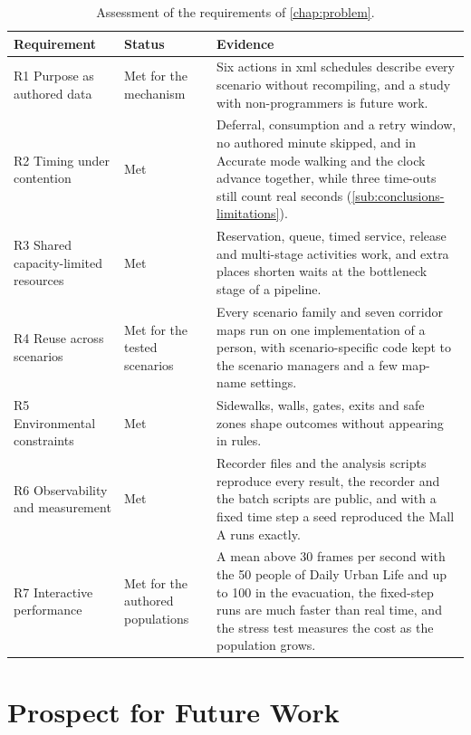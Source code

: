 \begin{table}[H]
\centering
\small
\renewcommand{\arraystretch}{1.1}
\begin{tabular}{|L{0.2\textwidth}|L{0.13\textwidth}|L{0.59\textwidth}|}
\hline
{}\textbf{Requirement} & \textbf{Status} & \textbf{Evidence} \\
\hline
R1 Purpose as authored data & Met for the mechanism & Six actions in \gls{xml} schedules describe every scenario without recompiling, and a study with non-programmers is future work. \\ \hline
R2 Timing under contention & Met & Deferral, consumption and a retry window, no authored minute skipped, and in Accurate mode walking and the clock advance together, while three time-outs still count real seconds (\cref{sub:conclusions-limitations}). \\ \hline
R3 Shared capacity-limited resources & Met & Reservation, queue, timed service, release and multi-stage activities work, and extra places shorten waits at the bottleneck stage of a pipeline. \\ \hline
R4 Reuse across scenarios & Met for the tested scenarios & Every scenario family and seven corridor maps run on one implementation of a person, with scenario-specific code kept to the scenario managers and a few map-name settings. \\ \hline
R5 Environmental constraints & Met & Sidewalks, walls, gates, exits and safe zones shape outcomes without appearing in rules. \\ \hline
R6 Observability and measurement & Met & Recorder files and the analysis scripts reproduce every result, the recorder and the batch scripts are public, and with a fixed time step a seed reproduced the Mall A runs exactly. \\ \hline
R7 Interactive performance & Met for the authored populations & A mean above 30 frames per second with the 50 people of Daily Urban Life and up to 100 in the evacuation, the fixed-step runs are much faster than real time, and the stress test measures the cost as the population grows. \\ \hline
\end{tabular}
\caption[Assessment of the requirements]{Assessment of the requirements of \cref{chap:problem}.}
\label{tab:requirements-assessment}
\end{table}

\section{Prospect for Future Work}\label{sec:future-work}

